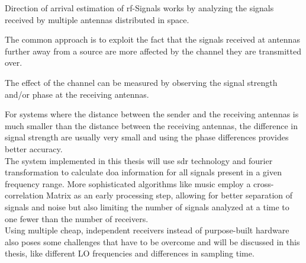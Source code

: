 Direction of arrival estimation of \acrshort{rf}-Signals
works by analyzing the signals received by
multiple antennas distributed in space.

The common approach is to exploit the fact
that the signals received at antennas further
away from a source are more affected by the channel
they are transmitted over.

The effect of the channel can be measured by
observing the signal strength and/or phase
at the receiving antennas.

For systems where the distance between
the sender and the receiving antennas is much
smaller than the distance between the receiving
antennas, the difference in signal strength
are usually very small and using the phase
differences provides better accuracy. \\

The system implemented in this thesis will use \gls{sdr}
technology and fourier transformation to calculate \gls{doa}
information for all signals present in a given frequency range.
More sophisticated algorithms like \acrshort{music} employ
a cross-correlation Matrix as an early processing step,
allowing for better separation of signals and noise
but also limiting the number of signals analyzed at
a time to one fewer than the number of receivers. \\

Using multiple cheap, independent receivers instead
of purpose-built hardware also poses some challenges
that have to be overcome and will be discussed in
this thesis, like different LO frequencies and differences
in sampling time.

